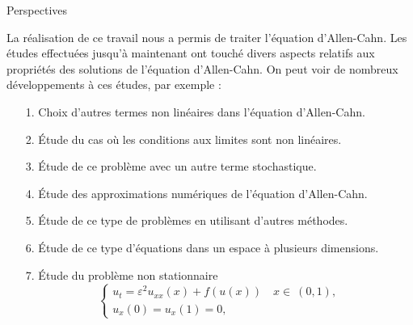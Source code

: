 \documentclass[mathserif,10pt]{beamer}
\begin{document}
\begin{frame}{Perspectives}\transglitter[duration=1]

La réalisation de ce travail nous a permis de traiter l'équation d'Allen-Cahn. Les études effectuées jusqu'à maintenant ont touché divers aspects relatifs aux propriétés
 des solutions  de l'équation d'Allen-Cahn. On peut voir de nombreux développements à ces études, par exemple :\pause
 
 \begin{itemize}
 \item[1.] Choix d'autres termes non linéaires dans l'équation d'Allen-Cahn.\pause
 
 \item[2.] \'Etude du cas où les conditions aux limites sont non linéaires.\pause
 
 \item[3.] \'Etude de ce problème avec un autre terme stochastique. \pause
 
\item[4.] \'Etude   des approximations numériques de l'équation d'Allen-Cahn.\pause

\item[5.]  \'Etude  de ce type de problèmes en utilisant d'autres méthodes.\pause

\item[6.] \'Etude de ce type d'équations dans un espace à plusieurs dimensions.\pause

\item[7.] \'Etude du problème non stationnaire \pause
$$
\begin{cases}
u_{t}= \varepsilon^{2}u_{xx}(x)+f(u(x)) \quad x \in  \ (0,1), \\[12pt]
u_{x}(0)=u_{x}(1)=0, 
\end{cases}
$$
 \end{itemize}

\end{frame}
\end{document}
